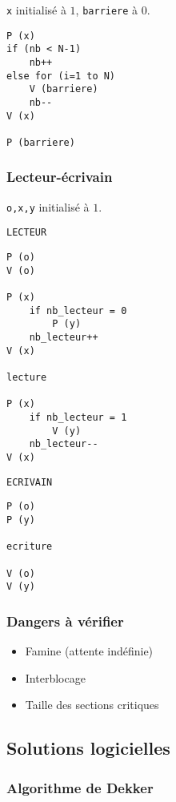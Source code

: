 \documentclass[a4paper]{article}
\begin{document}
\begin{multicols*}{2}
    \texttt{x} initialisé à $1$, \texttt{barriere} à $0$.

    \begin{lstlisting}[frame=shadowbox]
P (x)
if (nb < N-1)
    nb++
else for (i=1 to N) 
    V (barriere)
    nb--
V (x)

P (barriere)
    \end{lstlisting}

    \subsubsection{Lecteur-\'ecrivain}

    \texttt{o,x,y} initialisé à $1$.

    \texttt{LECTEUR}
    \begin{lstlisting}[frame=shadowbox]
P (o)
V (o)

P (x)
    if nb_lecteur = 0
        P (y)
    nb_lecteur++
V (x)

lecture

P (x)
    if nb_lecteur = 1
        V (y)
    nb_lecteur--
V (x)
    \end{lstlisting}


    \texttt{ECRIVAIN}
    \begin{lstlisting}[frame=shadowbox]
P (o)
P (y)

ecriture

V (o)
V (y)
    \end{lstlisting}

    \subsubsection{Dangers à vérifier}

    \begin{itemize}
        \item Famine (attente indéfinie)
        \item Interblocage
        \item Taille des sections critiques
    \end{itemize}

    \subsection{Solutions logicielles}

    \subsubsection{Algorithme de Dekker}


\end{multicols*}
\end{document}
